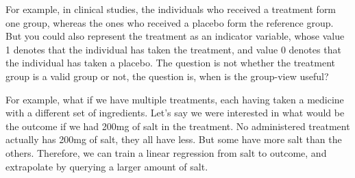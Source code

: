 \documentclass[backrefs]{cam-thesis}
\newcommand{\crit}[1]{\textcolor{red}{#1}}
\newcommand{\draft}[1]{\textcolor{blue}{#1}}
\begin{document}
For example, in clinical studies, the individuals who received a treatment form one group, whereas the ones who received a placebo form the reference group. But you could also represent the treatment as an indicator variable, whose value 1 denotes that the individual has taken the treatment, and value 0 denotes that the individual has taken a placebo. The question is not whether the treatment group is a valid group or not, the question is, when is the group-view useful? 

For example, what if we have multiple treatments, each having taken a medicine with a different set of ingredients. Let's say we were interested in what would be the outcome if we had 200mg of salt in the treatment. No administered treatment actually has 200mg of salt, they all have less. But some have more salt than the others. Therefore, we can train a linear regression from salt to outcome, and extrapolate by querying a larger amount of salt.









\end{document}
